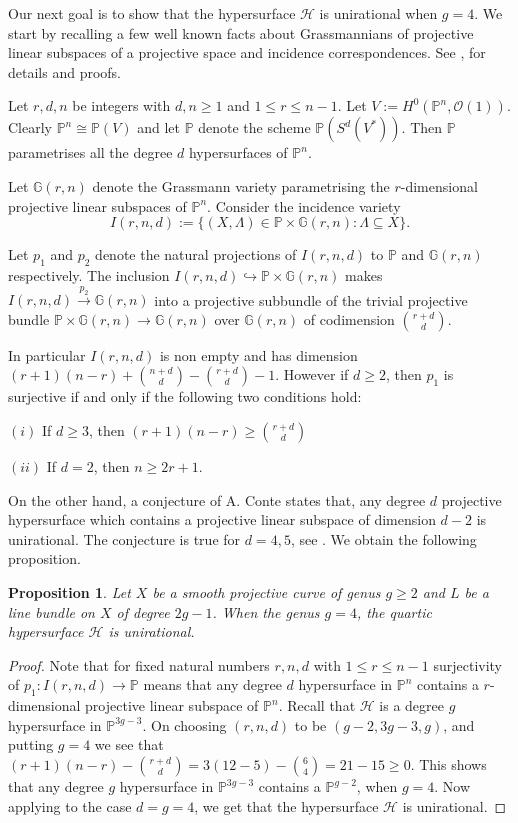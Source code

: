 \documentclass[12pt, reqno]{amsart}
\newtheorem{proposition}[theorem]{Proposition}
\begin{document}
 Our next goal is to show that the hypersurface $\mathcal{H}$ is unirational when $g=4$.  We start by recalling a few well known facts about Grassmannians of projective linear subspaces of a projective space and incidence correspondences. See \cite[\S 2 and Theorem 3.3]{AK}, for details and proofs.

Let $r, d, n$ be integers with $d,n\geq 1$ and $1\leq r\leq n-1$.  Let $V:=H^{0}(\mathbb{P}^{n},\mathcal{O}(1))$. Clearly $\mathbb{P}^{n}\cong \mathbb{P}(V)$ and let $\mathbb{P}$ denote the scheme $\mathbb{P}(S^{d}(V^{*}))$. Then $\mathbb{P}$ parametrises all the degree $d$ hypersurfaces of $\mathbb{P}^{n}$. 

Let $\mathbb{G}(r,n)$ denote the Grassmann variety parametrising the $r$-dimensional projective linear subspaces of $\mathbb{P}^{n}$. Consider the incidence variety
 \[I(r,n,d):=\{(X,\Lambda)\in \mathbb{P}\times \mathbb{G}(r,n) : \Lambda\subseteq X\}.\] 

Let $p_{1}$ and $p_{2}$ denote the natural projections of $I(r,n,d)$ to $\mathbb{P}$ and $\mathbb{G}(r,n)$ respectively. The inclusion $I(r,n,d)\hookrightarrow \mathbb{P}\times \mathbb{G}(r,n)$ makes $I(r,n,d)\overset{p_{2}}\longrightarrow \mathbb{G}(r,n)$ into a projective subbundle of the trivial projective bundle $\mathbb{P}\times \mathbb{G}(r,n)\rightarrow \mathbb{G}(r,n)$ over $\mathbb{G}(r,n)$ of codimension $\binom {r+d}{d}$. 

In particular $I(r,n,d)$ is non empty and has dimension $(r+1)(n-r)+\binom{n+d}{d}-\binom{r+d}{d}-1$.  However if $d\geq 2$, then $p_{1}$ is surjective if and only if the following two conditions hold:

$(i)$ If $d\geq 3$, then $(r+1)(n-r)\geq \binom{r+d}{d}$

$(ii)$ If $d=2$, then $n\geq 2r+1$.

On the other hand, a conjecture of A. Conte states that, any degree $d$ projective hypersurface which contains a projective linear subspace of dimension $d-2$ is unirational. The conjecture is true for $d=4,5$, see \cite[pg 312]{M}. We obtain the following proposition.

\begin{proposition}\label{12}
Let $X$ be a smooth projective curve of genus $g\geq 2$ and $L$ be a line bundle on $X$ of degree $2g-1$. When the genus $g=4$, the quartic hypersurface $\mathcal{H}$ is unirational.
\end{proposition}
\begin{proof}
    Note that for fixed natural numbers $r,n,d$ with $1\leq r\leq n-1$ surjectivity of $p_{1}:I(r,n,d)\rightarrow \mathbb{P}$ means that any degree $d$ hypersurface in $\mathbb{P}^{n}$ contains a $r$- dimensional projective linear subspace of $\mathbb{P}^{n}$. Recall that $\mathcal{H}$ is a degree $g$ hypersurface in $\mathbb{P}^{3g-3}$. On choosing $(r,n,d)$ to be $(g-2,3g-3,g)$, and putting $g=4$ we see that $(r+1)(n-r)-\binom{r+d}{d}= 3(12-5)-\binom{6}{4}=21-15\geq 0$. This shows that any degree $g$ hypersurface in $\mathbb{P}^{3g-3}$ contains a $\mathbb{P}^{g-2}$, when $g=4$. Now applying \cite[Pg.312]{M} to the case $d=g=4$, we get that the hypersurface $\mathcal{H}$ is unirational.
\end{proof}
\end{document}
